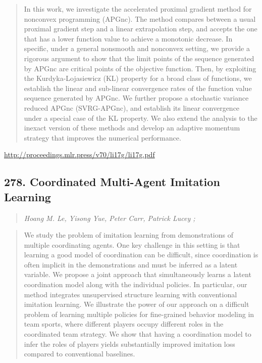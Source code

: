 \documentclass{article}
\begin{document}
\begin{quote}
    In this work, we investigate the accelerated proximal gradient method for nonconvex programming (APGnc). The method compares between a usual proximal gradient step and a linear extrapolation step, and accepts the one that has a lower function value to achieve a monotonic decrease. In specific, under a general nonsmooth and nonconvex setting, we provide a rigorous argument to show that the limit points of the sequence generated by APGnc are critical points of the objective function. Then, by exploiting the Kurdyka-Lojasiewicz (KL) property for a broad class of functions, we establish the linear and sub-linear convergence rates of the function value sequence generated by APGnc. We further propose a stochastic variance reduced APGnc (SVRG-APGnc), and establish its linear convergence under a special case of the KL property. We also extend the analysis to the inexact version of these methods and develop an adaptive momentum strategy that improves the numerical performance.  \end{quote}

\href{http://proceedings.mlr.press/v70/li17g/li17g.pdf}{http://proceedings.mlr.press/v70/li17g/li17g.pdf}

\subsection{278. Coordinated Multi-Agent Imitation Learning}

\begin{quote}
\footnotesize{\textit{Hoang M. Le, Yisong Yue, Peter Carr, Patrick Lucey ;}}
\end{quote}

\begin{quote}
    We study the problem of imitation learning from demonstrations of multiple coordinating agents. One key challenge in this setting is that learning a good model of coordination can be difficult, since coordination is often implicit in the demonstrations and must be inferred as a latent variable. We propose a joint approach that simultaneously learns a latent coordination model along with the individual policies. In particular, our method integrates unsupervised structure learning with conventional imitation learning. We illustrate the power of our approach on a difficult problem of learning multiple policies for fine-grained behavior modeling in team sports, where different players occupy different roles in the coordinated team strategy. We show that having a coordination model to infer the roles of players yields substantially improved imitation loss compared to conventional baselines.  \end{quote}
\end{document}
